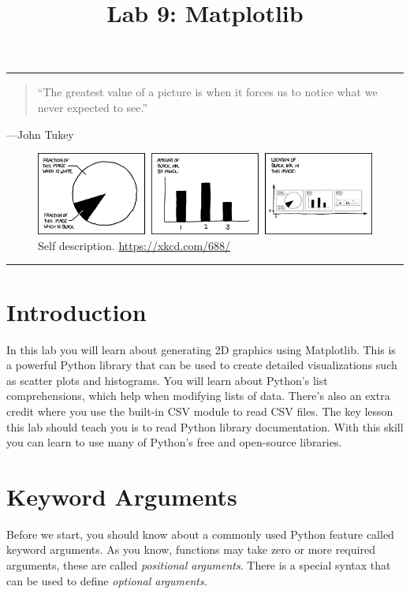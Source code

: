 \documentclass[11pt]{cselabheader}
\title{Lab 9: Matplotlib}
\begin{document}
\maketitle
{}
\hrule

\begin{quote}
``The greatest value of a picture is when it forces us to notice what we
never expected to see.''
\end{quote}
\begin{flushright}
---John Tukey
\end{flushright}

\begin{figure}[H]
  \centering
  \includegraphics[width=\textwidth]{img/xkcd_self_description.png}
  \caption{Self description. \url{https://xkcd.com/688/}}
\end{figure}

\hrule

\pagebreak
\tableofcontents

\section*{Introduction}
In this lab you will learn about generating 2D graphics using
Matplotlib.  This is a powerful Python library that can be used to
create detailed visualizations such as scatter plots and
histograms. You will learn about Python's list comprehensions, which
help when modifying lists of data.  There's also an extra credit where
you use the built-in CSV module to read CSV files.  The key lesson
this lab should teach you is to read Python library
documentation. With this skill you can learn to use many of Python's
free and open-source libraries.

\pagebreak
{}
\section{Keyword Arguments}
Before we start, you should know about a commonly used Python feature
called keyword arguments. As you know, functions may take zero or more
required arguments, these are called \textsl{positional arguments}.
There is a special syntax that can be used to define \textsl{optional
arguments.}
\end{document}

